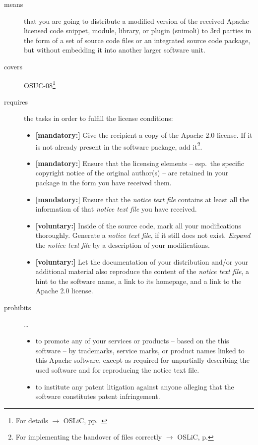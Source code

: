 \begin{description}
\item[means] that you are going to distribute a modified version of the received
Apache licensed code snippet, module, library, or plugin (snimoli) to 3rd
parties in the form of a set of source code files or an integrated source code
package, but without embedding it into another larger software unit.
\item[covers] OSUC-08\footnote{For details $\rightarrow$ OSLiC, pp.\ \pageref{OSUC-08-DEF}}
\item[requires] the tasks in order to fulfill the license conditions:
\begin{itemize}
  
  \item \textbf{[mandatory:]} Give the recipient a copy of the Apache 2.0
  license. If it is not already present in the software package, add
  it\footnote{For implementing the handover of files correctly $\rightarrow$
  OSLiC, p. \pageref{DistributingFilesHint}}.

  \item \textbf{[mandatory:]} Ensure that the licensing elements -- esp.\ the
  specific copyright notice of the original author(s) -- are retained in your
  package in the form you have received them.
  
  \item \textbf{[mandatory:]} Ensure that the \emph{notice text file} contains
  at least all the information of that \emph{notice text file} you have
  received.
 
  \item \textbf{[voluntary:]} Inside of the source code, mark all your
  modifications thoroughly. Generate a \emph{notice text file}, if it still does
  not exist. \emph{Expand} the \emph{notice text file} by a description of your
  modifications.
   
  \item \textbf{[voluntary:]} Let the documentation of your distribution and/or
  your additional material also reproduce the content of the \emph{notice text
  file}, a hint to the software name, a link to its homepage, and a link to the
  Apache 2.0 license.

\end{itemize}

\item[prohibits] \ldots
\begin{itemize}
  \item to promote any of your services or products – based on the this software
  – by trademarks, service marks, or product names linked to this Apache
  software, except as required for unpartially describing the used software and
  for reproducing the notice text file.
  \item to institute any patent litigation against anyone alleging that the
  software constitutes patent infringement.
\end{itemize}

\end{description}


